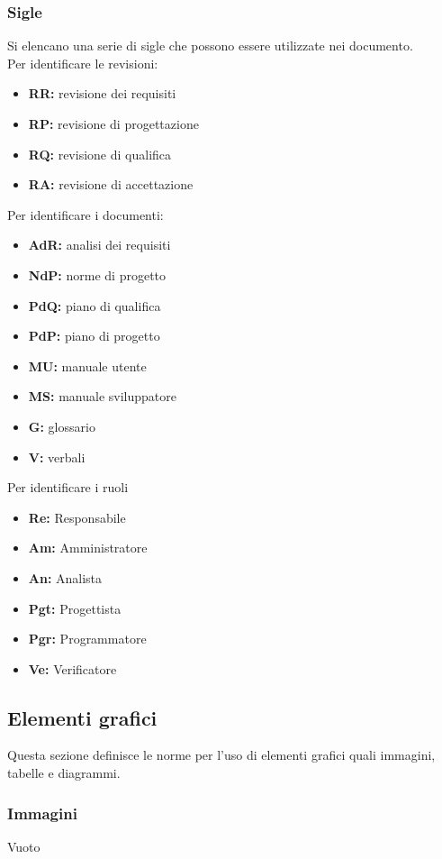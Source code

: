 \subsubsection{Sigle}
Si elencano una serie di sigle che possono essere utilizzate nei documento. 
\\
Per identificare le revisioni:
\begin{itemize}
\item \textbf{RR:} revisione dei requisiti
	\item \textbf{RP:} revisione di progettazione
	 	\item \textbf{RQ:} revisione di qualifica
			\item \textbf{RA:} revisione di accettazione
\end{itemize} 
Per identificare i documenti:
\begin{itemize}
\item \textbf{AdR:} analisi dei requisiti
	\item \textbf{NdP:} norme di progetto
		\item \textbf{PdQ:} piano di qualifica
			\item \textbf{PdP:} piano di progetto
				\item \textbf{MU:} manuale utente
					\item \textbf{MS:} manuale sviluppatore			
						\item \textbf{G:} glossario
							\item \textbf{V:} verbali
\end{itemize}
Per identificare i ruoli
\begin{itemize}
\item \textbf{Re:} Responsabile
	\item \textbf{Am:} Amministratore
		\item \textbf{An:} Analista
			\item \textbf{Pgt:} Progettista
				\item \textbf{Pgr:} Programmatore
					\item \textbf{Ve:} Verificatore
\end{itemize}
\subsection{Elementi grafici}
Questa sezione definisce le norme per l'uso di elementi grafici quali immagini, tabelle e diagrammi.
\subsubsection{Immagini}
{Vuoto}
